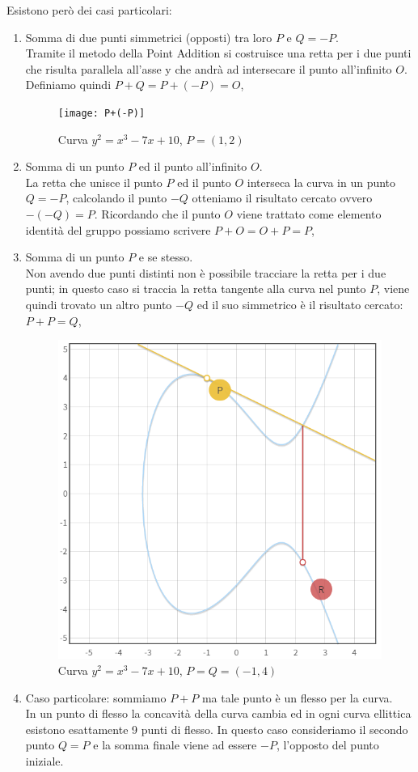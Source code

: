 \documentclass[a4paper,12pt]{tesiinfo}
\begin{document}
Esistono per\`o dei casi particolari:
\begin{enumerate}
    \item Somma di due punti simmetrici (opposti) tra loro $P$ e $Q = -P$. 
    \\
    Tramite il metodo della Point Addition si costruisce una retta per i due punti che risulta parallela all'asse y che andr\`a ad intersecare il punto all'infinito $O$. Definiamo quindi $P + Q = P+(-P) = O$,
    \begin{figure}[ht]
        \texttt{[image: P+(-P)]}
        \caption{Curva $y^2 = x^3-7x+10$, $P=(1, 2)$}
    \end{figure}
    \item Somma di un punto $P$ ed il punto all'infinito $O$. 
    \\ 
    La retta che unisce il punto $P$ ed il punto $O$ interseca la curva in un punto $Q = -P$, calcolando il punto $-Q$ otteniamo il risultato cercato ovvero $-(-Q) = P$.
    Ricordando che il punto $O$ viene trattato come elemento identit\`a del gruppo possiamo scrivere $P+O = O+P = P$,
    \item Somma di un punto $P$ e se stesso. 
    \\
    Non avendo due punti distinti non \`e possibile tracciare la retta per i due punti; in questo caso si traccia la retta tangente alla curva nel punto $P$, viene quindi trovato un altro punto $-Q$ ed il suo simmetrico \`e il risultato cercato: $P + P = Q$,
    \begin{figure}[ht]
        \includegraphics[width=.6\textwidth,center]{PA_P+P}
        \caption{Curva $y^2 = x^3-7x+10$, $P=Q=(-1, 4)$}
    \end{figure}
    \item Caso particolare: sommiamo $P+P$ ma tale punto \`e un flesso per la curva. 
    \\
    In un punto di flesso la concavit\`a della curva cambia ed in ogni curva ellittica esistono esattamente 9 punti di flesso. In questo caso consideriamo il secondo punto $Q =P$ e la somma finale viene ad essere $-P$, l'opposto del punto iniziale.
\end{enumerate}
\end{document}

